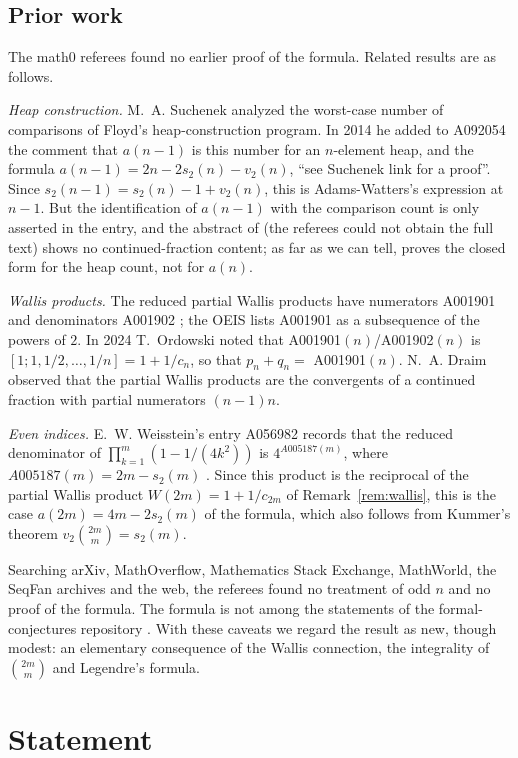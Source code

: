 \documentclass[11pt]{amsart}
\theoremstyle{plain}
\theoremstyle{definition}
\begin{document}
\subsection*{Prior work}
The math0 referees found no earlier proof of the formula. Related results are as follows.

\emph{Heap construction.} M.~A. Suchenek \cite{Suchenek} analyzed the worst-case number of comparisons of Floyd's heap-construction program. In 2014 he added to A092054 the comment that $a(n-1)$ is this number for an $n$-element heap, and the formula $a(n-1)=2n-2s_2(n)-v_2(n)$, ``see Suchenek link for a proof''. Since $s_2(n-1)=s_2(n)-1+v_2(n)$, this is Adams-Watters's expression at $n-1$. But the identification of $a(n-1)$ with the comparison count is only asserted in the entry, and the abstract of \cite{Suchenek} (the referees could not obtain the full text) shows no continued-fraction content; as far as we can tell, \cite{Suchenek} proves the closed form for the heap count, not for $a(n)$.

\emph{Wallis products.} The reduced partial Wallis products have numerators A001901 and denominators A001902 \cite{A001901}; the OEIS lists A001901 as a subsequence of the powers of $2$. In 2024 T.~Ordowski noted that A001901$(n)$/A001902$(n)$ is $[1;1,1/2,\dots,1/n]=1+1/c_n$, so that $p_n+q_n=$ A001901$(n)$. N.~A. Draim \cite{Draim} observed that the partial Wallis products are the convergents of a continued fraction with partial numerators $(n-1)n$.

\emph{Even indices.} E.~W. Weisstein's entry A056982 \cite{A056982} records that the reduced denominator of $\prod_{k=1}^{m}(1-1/(4k^2))$ is $4^{A005187(m)}$, where $A005187(m)=2m-s_2(m)$ \cite{OEIS}. Since this product is the reciprocal of the partial Wallis product $W(2m)=1+1/c_{2m}$ of Remark~\ref{rem:wallis}, this is the case $a(2m)=4m-2s_2(m)$ of the formula, which also follows from Kummer's theorem $v_2\binom{2m}{m}=s_2(m)$.

Searching arXiv, MathOverflow, Mathematics Stack Exchange, MathWorld, the SeqFan archives and the web, the referees found no treatment of odd $n$ and no proof of the formula. The formula is not among the statements of the formal-conjectures repository \cite{FC}. With these caveats we regard the result as new, though modest: an elementary consequence of the Wallis connection, the integrality of $\binom{2m}{m}$ and Legendre's formula.

\section{Statement}\label{sec:statement}
\end{document}
